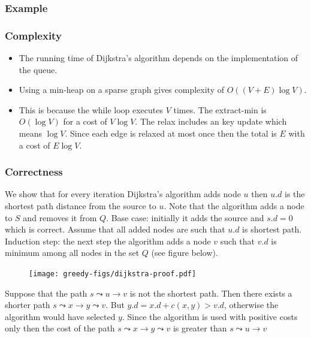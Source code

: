\documentclass{beamer}
\begin{document}
\begin{frame}
  \frametitle{Example}
\end{frame}

\begin{frame}
  \frametitle{Complexity}
  \begin{itemize}
  \item The running time of Dijkstra's algorithm depends on the
    implementation of the queue.
  \item Using a min-heap on a sparse graph gives complexity of
    $O((V+E)\log V)$.
  \item This is because the while loop executes $V$ times. The
    extract-min is $O(\log V)$ for a cost of $V\log V$. The relax
    includes an key update which means $\log V$. Since each edge is
    relaxed at most once then the total is $E$ with a cost of $E\log V$.
  \end{itemize}
\end{frame}

\begin{frame}
  \frametitle{Correctness}
  We show that for every iteration Dijkstra's algorithm adds node $u$ then $u.d$ is the shortest path distance from the source to $u$.
Note that the algorithm adds a node to $S$ and removes it from $Q$. Base case: initially it adds the source and $s.d=0$ which is correct.
Assume that all added nodes are such that $u.d$ is shortest path. Induction step: the next step the algorithm adds a node $v$ such that $v.d$ is minimum
among all nodes in the set $Q$ (see figure below). 
 \begin{figure}[h]
    \centering
    \texttt{[image: greedy-figs/dijkstra-proof.pdf]}
  \end{figure}
\end{frame}

\begin{frame}
  Suppose that the path $s\leadsto u\rightarrow v$ is not the shortest path. Then there exists a shorter
path $s\leadsto x\rightarrow y\leadsto v$. But $y.d=x.d+c(x,y)>v.d$, otherwise the algorithm would have selected $y$. Since the algorithm is used
with positive costs only then the cost of the path $s\leadsto x\rightarrow y\leadsto v$ is greater than $s\leadsto u\rightarrow v$
\end{frame}
\end{document}
